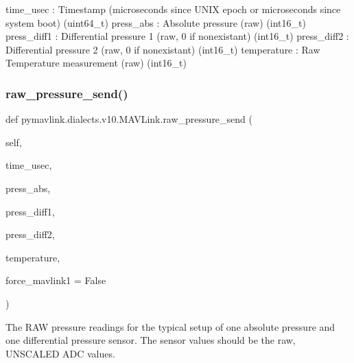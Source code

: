 \begin{DoxyVerb}
\begin{DoxyVerb}
\begin{DoxyVerb}
\begin{DoxyVerb}
\begin{DoxyVerb}
time_usec                 : Timestamp (microseconds since UNIX epoch or microseconds since system boot) (uint64_t)
press_abs                 : Absolute pressure (raw) (int16_t)
press_diff1               : Differential pressure 1 (raw, 0 if nonexistant) (int16_t)
press_diff2               : Differential pressure 2 (raw, 0 if nonexistant) (int16_t)
temperature               : Raw Temperature measurement (raw) (int16_t)\end{DoxyVerb}
 \mbox{\label{classpymavlink_1_1dialects_1_1v10_1_1MAVLink_a1ddaad5d2c8ed739c4a0318318c8ffe6}} 
\subsubsection{\texorpdfstring{raw\+\_\+pressure\+\_\+send()}{raw\_pressure\_send()}}
{\footnotesize\ttfamily def pymavlink.\+dialects.\+v10.\+M\+A\+V\+Link.\+raw\+\_\+pressure\+\_\+send (\begin{DoxyParamCaption}\item[{}]{self,  }\item[{}]{time\+\_\+usec,  }\item[{}]{press\+\_\+abs,  }\item[{}]{press\+\_\+diff1,  }\item[{}]{press\+\_\+diff2,  }\item[{}]{temperature,  }\item[{}]{force\+\_\+mavlink1 = {\ttfamily False} }\end{DoxyParamCaption})}

\begin{DoxyVerb}The RAW pressure readings for the typical setup of one absolute
pressure and one differential pressure sensor. The
sensor values should be the raw, UNSCALED ADC values.


\end{DoxyVerb}
\end{DoxyVerb}
\end{DoxyVerb}
\end{DoxyVerb}
\end{DoxyVerb}
